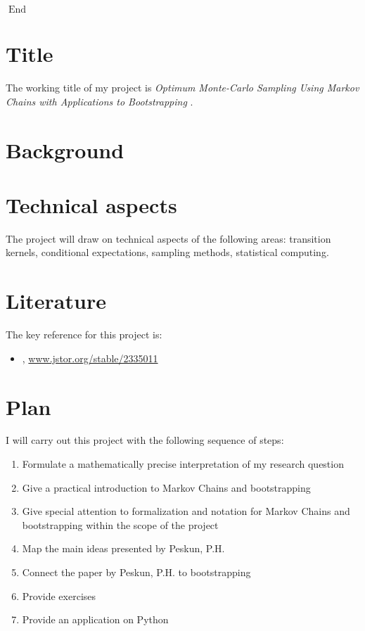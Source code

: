 \documentclass[]{STAT_547C}
\DeclareMathOperator{\End}{End}
\begin{document}
$\End$

\vspace{-2cm}


\section{Title}

The working title of my project is \emph{
Optimum Monte-Carlo Sampling Using Markov Chains with Applications to Bootstrapping
}.  

\section{Background}



\section{Technical aspects}

The project will draw on technical aspects of the following areas: transition kernels, conditional expectations, sampling methods, statistical computing.


\section{Literature}

The key reference for this project is:

\begin{itemize}
\item \citet{Peskun, P. H. ``Optimum Monte-Carlo Sampling Using Markov Chains.'' Biometrika, vol. 60, no. 3, 1973, pp. 607-612. JSTOR}, \href{www.jstor.org/stable/2335011}{www.jstor.org/stable/2335011}
\end{itemize}


\section{Plan}

I will carry out this project with the following sequence of steps: 
\begin{enumerate}
	\item Formulate a mathematically precise interpretation of my research question
	\item Give a practical introduction to Markov Chains and bootstrapping
	\item Give special attention to formalization and notation for Markov Chains and bootstrapping within the scope of the project
  \item Map the main ideas presented by Peskun, P.H.
  \item Connect the paper by Peskun, P.H. to bootstrapping
  \item Provide exercises
  \item Provide an application on Python
\end{enumerate}
\end{document}
